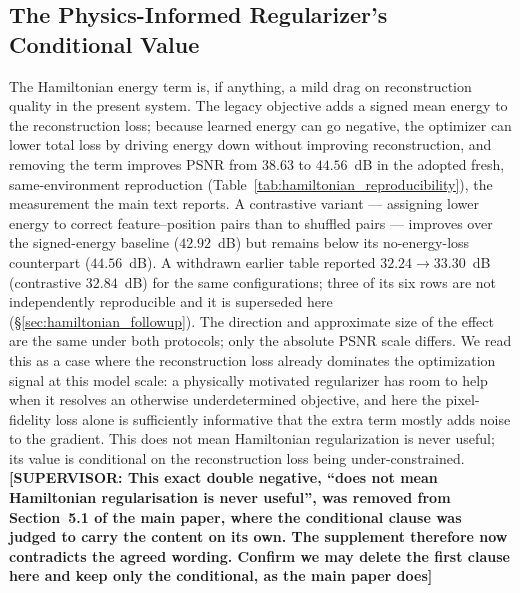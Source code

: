 \documentclass[11pt]{article}
\begin{document}
\subsection{The Physics-Informed Regularizer's Conditional Value}
The Hamiltonian energy term is, if anything, a mild drag on reconstruction quality in the present system. The legacy objective adds a signed mean energy to the reconstruction loss; because learned energy can go negative, the optimizer can lower total loss by driving energy down without improving reconstruction, and removing the term improves PSNR from $38.63$ to $44.56$~dB in the adopted fresh, same-environment reproduction (Table~\ref{tab:hamiltonian_reproducibility}), the measurement the main text reports. A contrastive variant --- assigning lower energy to correct feature--position pairs than to shuffled pairs --- improves over the signed-energy baseline ($42.92$~dB) but remains below its no-energy-loss counterpart ($44.56$~dB). A withdrawn earlier table reported $32.24\rightarrow33.30$~dB (contrastive $32.84$~dB) for the same configurations; three of its six rows are not independently reproducible and it is superseded here (\S\ref{sec:hamiltonian_followup}). The direction and approximate size of the effect are the same under both protocols; only the absolute PSNR scale differs. We read this as a case where the reconstruction loss already dominates the optimization signal at this model scale: a physically motivated regularizer has room to help when it resolves an otherwise underdetermined objective, and here the pixel-fidelity loss alone is sufficiently informative that the extra term mostly adds noise to the gradient. This does not mean Hamiltonian regularization is never useful; its value is conditional on the reconstruction loss being under-constrained. {\color{red}\textbf{[SUPERVISOR: This exact double negative, ``does not mean Hamiltonian regularisation is never useful'', was removed from Section~5.1 of the main paper, where the conditional clause was judged to carry the content on its own. The supplement therefore now contradicts the agreed wording. Confirm we may delete the first clause here and keep only the conditional, as the main paper does]}}
\end{document}
